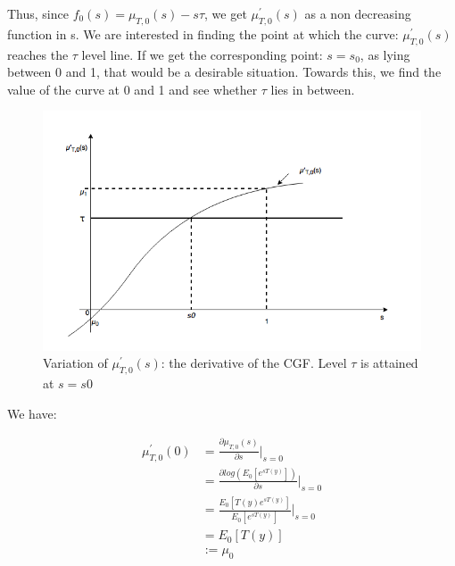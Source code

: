 \documentclass[12pt]{report}
\begin{document}
\noindent Thus, since  $f_0(s) = \mu_{T,0}(s) - s\tau $, we get  $ \mu^\prime_{T,0}(s)$ as a non decreasing function in s. We are interested in finding the point at which the curve: $ \mu^\prime_{T,0}(s)$  reaches the $\tau$ level line. If we get the corresponding point: $ s = s_0$, as lying between 0 and 1, that would be a desirable situation. Towards this, we find the value of the curve at 0 and 1 and see whether $\tau$ lies in between.


\begin{figure}[h]
\centering
\includegraphics[scale=1]{Figures/CGF_Derivative}
\caption{Variation of  $\mu^\prime_{T,0}(s) $: the derivative of the CGF. Level $\tau$ is attained at $s = s0$}
\label{fig:Mu0dash}
\end{figure}



\newpage
\noindent  We have:


 
            \begin{equation}
            \begin{aligned}
                       \mu^\prime_{T,0}(0) &=  \frac{\partial \mu_{T,0}(s)}{\partial s}\Bigr|_{s = 0}\\
                                                          &=\frac{\partial log(E_0[e^{sT(y)}])}{\partial s}\Bigr|_{s = 0}\\
                                                          &=\frac{E_0[T(y)e^{sT(y)}]}{E_0[e^{sT(y)}]}\Bigr|_{s = 0}\\
                                                          &=E_0[T(y)]\\
                                                          &:=\mu_0\\
            \end{aligned}
            \end{equation}
\end{document}
